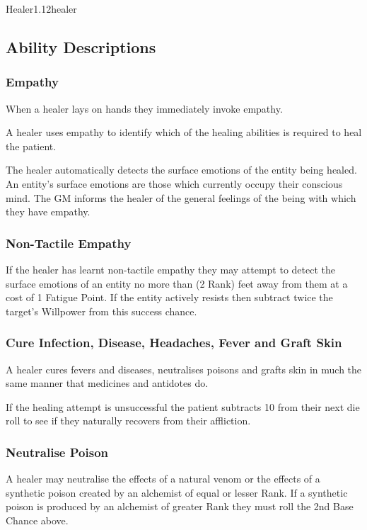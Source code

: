 \begin{skill*}{Healer}{1.12}{healer}
\subsection{Ability Descriptions}

\subsubsection{Empathy}
When a healer lays on hands they immediately invoke empathy.

A healer uses empathy to identify which of the healing abilities is
required to heal the patient.

The healer automatically detects the surface emotions of the entity
being healed. An entity's surface emotions are those which currently
occupy their conscious mind. The GM informs the healer of the general
feelings of the being with which they have empathy.

\subsubsection{Non-Tactile Empathy}

If the healer has learnt non-tactile empathy they may attempt to
detect the surface emotions of an entity no more than (2 \x Rank) feet
away from them at a cost of 1 Fatigue Point. If the entity actively
resists then subtract twice the target's Willpower from this success
chance.

\subsubsection{Cure Infection, Disease, Headaches, Fever and Graft Skin}
\label{healer:cure}
A healer cures fevers and diseases, neutralises poisons and grafts
skin in much the same manner that medicines and antidotes do.

If the healing attempt is unsuccessful the patient subtracts 10 from
their next die roll to see if they naturally recovers from their
affliction.

\subsubsection{Neutralise Poison}

A healer may neutralise the effects of a natural venom or the effects
of a synthetic poison created by an alchemist of equal or lesser
Rank. If a synthetic poison is produced by an alchemist of greater
Rank they must roll the 2nd Base Chance above.


\end{skill*}
